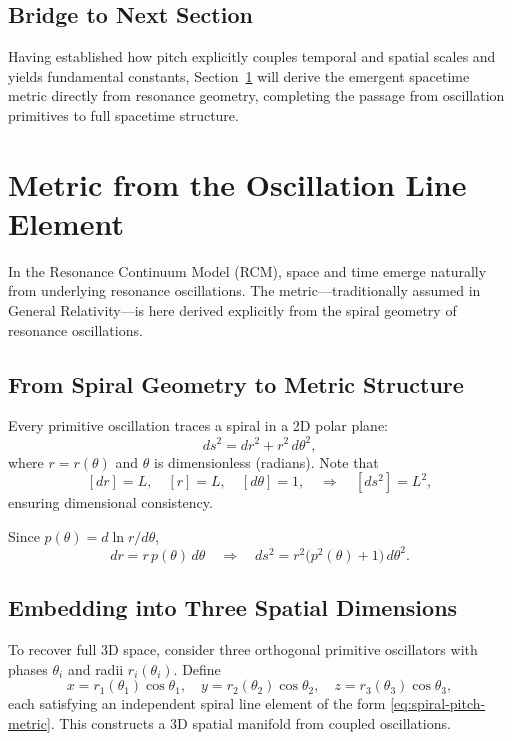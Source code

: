 \subsection{Bridge to Next Section}

Having established how pitch explicitly couples temporal and spatial scales and yields fundamental constants, Section~\ref{sec:metric-emergence} will derive the emergent spacetime metric directly from resonance geometry, completing the passage from oscillation primitives to full spacetime structure.


\section{Metric from the Oscillation Line Element}
\label{sec:metric-emergence}

In the Resonance Continuum Model (RCM), space and time emerge naturally from underlying resonance oscillations. The metric—traditionally assumed in General Relativity—is here derived explicitly from the spiral geometry of resonance oscillations.

\subsection{From Spiral Geometry to Metric Structure}
\label{sec:spiral-metric}

Every primitive oscillation traces a spiral in a 2D polar plane:
\begin{equation}
  ds^2 = dr^2 + r^2\,d\theta^2,
  \label{eq:spiral-line-element}
\end{equation}
where \(r=r(\theta)\) and \(\theta\) is dimensionless (radians).  Note that
\[
  [dr]=L,\quad [r]=L,\quad [d\theta]=1,
  \quad\Longrightarrow\quad [ds^2]=L^2,
\]
ensuring dimensional consistency.

Since \(p(\theta)=d\ln r/d\theta\),
\begin{equation}
  dr = r\,p(\theta)\,d\theta
  \quad\Longrightarrow\quad
  ds^2 = r^2\bigl(p^2(\theta)+1\bigr)\,d\theta^2.
  \label{eq:spiral-pitch-metric}
\end{equation}

\subsection{Embedding into Three Spatial Dimensions}
\label{sec:3d-coordinates}

To recover full 3D space, consider three orthogonal primitive oscillators with phases \(\theta_i\) and radii \(r_i(\theta_i)\).  Define
\begin{equation}
  x = r_1(\theta_1)\cos\theta_1,\quad
  y = r_2(\theta_2)\cos\theta_2,\quad
  z = r_3(\theta_3)\cos\theta_3,
  \label{eq:3d-coords}
\end{equation}
each satisfying an independent spiral line element of the form \eqref{eq:spiral-pitch-metric}.  This constructs a 3D spatial manifold from coupled oscillations.

